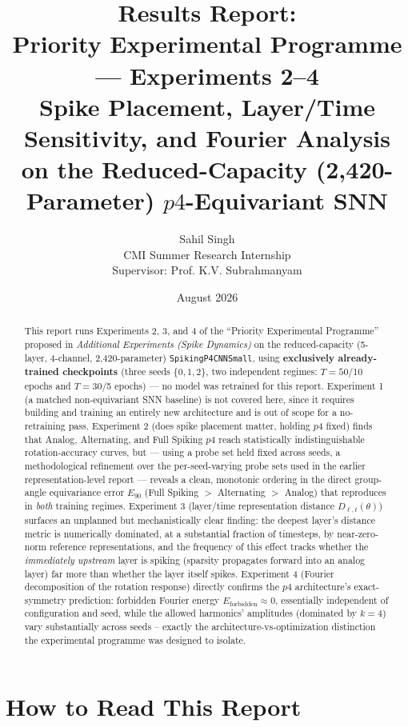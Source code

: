 \documentclass[11pt]{article}
\title{\Large Results Report:\\
Priority Experimental Programme --- Experiments 2--4\\
\large Spike Placement, Layer/Time Sensitivity, and Fourier Analysis\\
on the Reduced-Capacity (2{,}420-Parameter) $p4$-Equivariant SNN}
\author{Sahil Singh\\
CMI Summer Research Internship\\
Supervisor: Prof. K.V. Subrahmanyam}
\date{August 2026}
\begin{document}
\maketitle

\begin{abstract}
This report runs Experiments 2, 3, and 4 of the ``Priority Experimental Programme'' proposed in
\emph{Additional Experiments (Spike Dynamics)} on the reduced-capacity (5-layer, 4-channel,
2{,}420-parameter) \texttt{SpikingP4CNNSmall}, using \textbf{exclusively already-trained checkpoints}
(three seeds $\{0,1,2\}$, two independent regimes: $T{=}50$/10 epochs and $T{=}30$/5 epochs) --- no
model was retrained for this report. Experiment 1 (a matched non-equivariant SNN baseline) is not
covered here, since it requires building and training an entirely new architecture and is out of
scope for a no-retraining pass. Experiment 2 (does spike placement matter, holding $p4$ fixed) finds
that Analog, Alternating, and Full Spiking $p4$ reach statistically indistinguishable rotation-accuracy
curves, but --- using a probe set held fixed across seeds, a methodological refinement over the
per-seed-varying probe sets used in the earlier representation-level report --- reveals a clean,
monotonic ordering in the direct group-angle equivariance error $E_{90}$ (Full Spiking $>$ Alternating
$>$ Analog) that reproduces in \emph{both} training regimes. Experiment 3 (layer/time representation
distance $D_{\ell,t}(\theta)$) surfaces an unplanned but mechanistically clear finding: the deepest
layer's distance metric is numerically dominated, at a substantial fraction of timesteps, by
near-zero-norm reference representations, and the frequency of this effect tracks whether the
\emph{immediately upstream} layer is spiking (sparsity propagates forward into an analog layer) far
more than whether the layer itself spikes. Experiment 4 (Fourier decomposition of the rotation
response) directly confirms the $p4$ architecture's exact-symmetry prediction: forbidden Fourier
energy $E_{\text{forbidden}} \approx 0$, essentially independent of configuration and seed, while the
allowed harmonics' amplitudes (dominated by $k{=}4$) vary substantially across seeds -- exactly the
architecture-vs-optimization distinction the experimental programme was designed to isolate.
\end{abstract}

\tableofcontents

\section{How to Read This Report}
\end{document}
